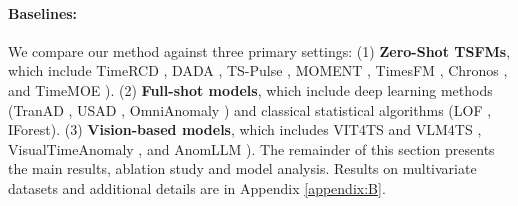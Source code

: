 \documentclass{article}
\theoremstyle{plain}
\theoremstyle{definition}
\theoremstyle{remark}
\begin{document}
\paragraph{Baselines:}
We compare our method against three primary settings: (1) \textbf{Zero-Shot TSFMs}, which include TimeRCD \cite{lan2025foundationmodelszeroshottime}, DADA \cite{shentu2024towards}, TS-Pulse \cite{ekambaram2025tspulse}, MOMENT \cite{goswami2024moment}, TimesFM \cite{das2024decoder}, Chronos \cite{ansari2024chronos}, and TimeMOE \cite{shi2024time}). (2) \textbf{Full-shot models}, which include deep learning methods (TranAD \cite{tuli2022tranad}, USAD \cite{audibert2020usad}, OmniAnomaly \cite{su2019robust}) and classical statistical algorithms (LOF \cite{breunig2000lof}, IForest\cite{liu2008isolation}). (3) \textbf{Vision-based models}, which includes VIT4TS and VLM4TS \cite{he2025harnessing}, VisualTimeAnomaly \cite{xu2025can}, and AnomLLM \cite{zhou2024llmsunderstandtimeseries}). 
The remainder of this section presents the main results, ablation study and model analysis. Results on multivariate datasets and additional details are in Appendix \ref{appendix:B}.
\end{document}
